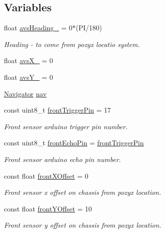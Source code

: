\subsection*{Variables}
\begin{DoxyCompactItemize}
\item 
float \mbox{\hyperlink{bot_main_8ino_a26ae4f60d3d4ebfa68763710b6f20e7c}{avs\+Heading\+\_\+}} = 0$\ast$(PI/180)
\begin{DoxyCompactList}\small\item\em Heading -\/ to come from pozyx locatio system. \end{DoxyCompactList}\item 
float \mbox{\hyperlink{bot_main_8ino_a36b5ddac5fd4781d96ab1f7afb628e63}{avs\+X\+\_\+}} = 0
\item 
float \mbox{\hyperlink{bot_main_8ino_aa4d40143b7595abf8807c96ac5fd82e2}{avs\+Y\+\_\+}} = 0
\item 
\mbox{\hyperlink{class_navigator}{Navigator}} \mbox{\hyperlink{bot_main_8ino_a4d757d2a3d2bcf4b98f6f4a72d7df7de}{nav}}
\item 
const uint8\+\_\+t \mbox{\hyperlink{bot_main_8ino_a33df7a8dbfd90327fda79c01f944f56a}{front\+Trigger\+Pin}} = 17
\begin{DoxyCompactList}\small\item\em Front sensor arduino trigger pin number. \end{DoxyCompactList}\item 
const uint8\+\_\+t \mbox{\hyperlink{bot_main_8ino_a878ae4b68ec48fc902c4aa953ad565b4}{front\+Echo\+Pin}} = \mbox{\hyperlink{bot_main_8ino_a33df7a8dbfd90327fda79c01f944f56a}{front\+Trigger\+Pin}}
\begin{DoxyCompactList}\small\item\em Front sensor arduino echo pin number. \end{DoxyCompactList}\item 
const float \mbox{\hyperlink{bot_main_8ino_abdd898a2dfa2f64e2821af36c6ed3724}{front\+X\+Offset}} = 0
\begin{DoxyCompactList}\small\item\em Front sensor x offset on chassis from pozyx location. \end{DoxyCompactList}\item 
const float \mbox{\hyperlink{bot_main_8ino_a4919465d0182f44aa7acaa39ece1e17a}{front\+Y\+Offset}} = 10
\begin{DoxyCompactList}\small\item\em Front sensor y offset on chassis from pozyx location. \end{DoxyCompactList}\item 

\end{DoxyCompactItemize}

